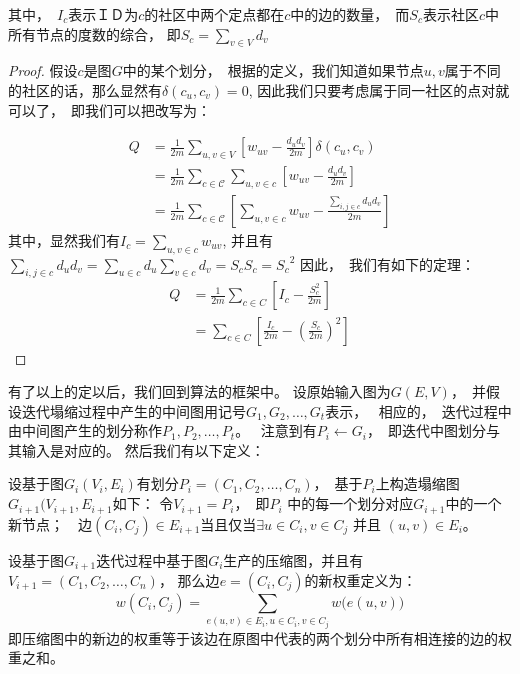 \documentclass[master]{njuthesis}
\begin{document}
其中，　$I_c$表示ＩＤ为$c$的社区中两个定点都在$c$中的边的数量，　而$S_c$表示社区$c$中所有节点的度数的综合，
即$S_c = \sum\limits_{v \in V} {d_v}$
\begin{proof}
假设$c$是图$G$中的某个划分，　根据\label{eq:modularity}的定义，我们知道如果节点$u, v$属于不同的社区的话，那么显然有$\delta(c_u, c_v)=0$,
因此我们只要考虑属于同一社区的点对就可以了，　即我们可以把\label{eq:modularity}改写为：

\begin{equation}
\begin{aligned}
Q &= \frac{1}{2m}\sum\limits_{u, v \in V} \left[w_{uv} - \frac{{d_u}{d_v}}{2m} \right]\delta(c_u, c_v) \\
& = \frac{1}{2m}\sum\limits_{c \in \mathcal{C}} {\sum\limits_{u, v \in c} { \left[w_{uv} - \frac{{d_u}{d_v}}{2m} \right]}} \\
& = \frac{1}{2m}\sum\limits_{c \in \mathcal{C}} \left[{\sum\limits_{u, v \in c} { w_{uv} - \frac{\sum\nolimits_{i,j \in c}{{d_u}{d_v}}}{2m}}}\right] 
\end{aligned}
\end{equation}
其中，显然我们有$I_c=\sum\nolimits_{u, v \in c}  w_{uv}$, 
并且有$\sum\nolimits_{i,j \in c}{{d_u}{d_v}} =
\sum\nolimits_{u \in c}{d_u} \sum\nolimits_{v \in c}{d_v} = S_c S_c = {S_c}^2$
因此，　我们有如下的定理：
\begin{equation}
\begin{aligned}
Q &= \frac{1}{2m}\sum\limits_{c \in C} \left[I_c - \frac{S_c^2}{2m} \right] \\
& = \sum\limits_{c \in C} \left[\frac{I_c}{2m} - {\left(\frac{S_c}{2m}\right)}^2 \right]
\end{aligned}
\end{equation}
\end{proof}
有了以上的定以后，我们回到算法\label{algo:mlgp}的框架中。
设原始输入图为$G(E,V)$，　并假设迭代塌缩过程中产生的中间图用记号$G_1, G_2, \dots, G_t$表示，　
相应的，　迭代过程中由中间图产生的划分称作$P_1, P_2, \dots, P_{t}$。　
注意到有$P_i \gets G_i$，　即迭代中图划分与其输入是对应的。
然后我们有以下定义：
\begin{definition}
 设基于图$G_i(V_i, E_i)$有划分$P_i=(C_1, C_2, \dots, C_n)$，　基于$P_i$上构造塌缩图$G_{i+1}(V_{i+1}, E_{i+1}$如下：
 令$V_{i+1} = P_i$，　即$P_i$ 中的每一个划分对应$G_{i+1}$中的一个新节点；　边$(C_i, C_j) \in E_{i+1}$当且仅当$\exists
 u \in C_i, v \in C_j$ 并且 $(u, v) \in E_i$。
\end{definition}
\begin{definition}
 设基于图$G_{i+1}$迭代过程中基于图$G_i$生产的压缩图，并且有$V_{i+1}=(C_1, C_2, \dots, C_n)$，
 那么边$e=(C_i, C_j)$的新权重定义为：
 \begin{equation}
w(C_i, C_j) = \sum\limits_{e(u,v) \in E_i, u \in C_i, v \in C_j} w\big(e(u,v)\big)
\end{equation}
即压缩图中的新边的权重等于该边在原图中代表的两个划分中所有相连接的边的权重之和。
\end{definition}
\end{document}
